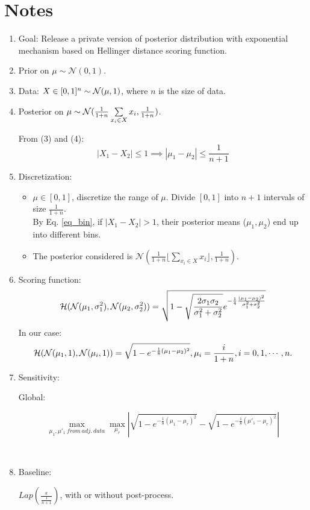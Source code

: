 \documentclass{article}
\begin{document}
\section{Notes}
\label{sec_intro}
\begin{enumerate}
  \item Goal: Release a private version of posterior distribution with exponential mechanism based on Hellinger distance scoring function.
  \item Prior on $\mu \sim \mathcal{N} (0,1)$.
  \item Data: $X \in [0,1] ^ n \sim \mathcal{N}(\mu,1)$, where $n$ is the size of data.
  \item Posterior on $\mu \sim \mathcal{N}(\frac{1}{1 + n} \sum\limits_{x_i \in X} x_i,\frac{1}{1 + n})$.

  From (3) and (4): 
  \begin{equation}
  \label{eq_bin}
  |X_1 - X_2| \leq 1 \implies |\mu_1 - \mu_2| \leq \frac{1}{n + 1}
  \end{equation}

  \item Discretization:
  \begin{itemize}
    \item $\mu \in [0,1]$, discretize the range of $\mu$. Divide $[0,1]$ into $n+1$ intervals of size $\frac{1}{1 + n}$.\\
    By Eq. \ref{eq_bin}, if $|X_1 - X_2| > 1$, their posterior means ($\mu_1, \mu_2$) end up into different bins.
    \item The posterior considered is $\mathcal{N} (\frac{1}{1 + n} \lfloor\sum_{x_i \in X} x_i \rfloor, \frac{1}{1 + n})$.
  \end{itemize}
  \item Scoring function:
  \[
  \mathcal{H}(\mathcal{N}(\mu_1,\sigma_1^2), \mathcal{N}(\mu_2,\sigma_2^2)) = \sqrt{1 - \sqrt{\frac{2 \sigma_1 \sigma_2}{\sigma_1^2 + \sigma_2^2}} e^{-\frac{1}{4} \frac{(\mu_1 -\mu_2) ^ 2}{\sigma_1^2 + \sigma_2^2}}}
  \]
  In our case:
  \[
  \mathcal{H}(\mathcal{N}(\mu_1,1), \mathcal{N}(\mu_i,1)) = \sqrt{1 - e^{-\frac{1}{8}(\mu_1 -\mu_2) ^ 2}}, \mu_i = \frac{i}{1 + n}, i = 0, 1, \cdots, n.
  \]

  \item Sensitivity:

  Global:

  \[
  \max\limits_{\mu_1,\mu'_1\ from\ adj.\ data} \max\limits_{\mu_r} |\sqrt{1 - e^{-\frac{1}{8}(\mu_1 -\mu_r) ^ 2}} - \sqrt{1 - e^{-\frac{1}{8}(\mu'_1 -\mu_r) ^ 2}}|
  \]

  \

  \item Baseline:

  $Lap(\frac{\epsilon}{\frac{1}{n+1}})$, with or without post-process.

\end{enumerate}






\end{document}
